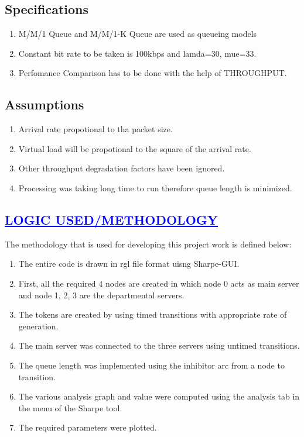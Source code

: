 \documentclass[a4paper,12pt]{report}
\begin{document}
\section*{Specifications}
\begin{enumerate}
 

 \item M/M/1 Queue and M/M/1-K Queue are used as queueing models
 \item Constant bit rate to be taken is 100kbps and lamda=30, mue=33.
 \item Perfomance Comparison has to be done with the help of THROUGHPUT.
\end{enumerate}

\section*{Assumptions}
\begin{enumerate}
\item Arrival rate propotional to tha packet size.
\item Virtual load will be propotional to the square of the arrival rate.
\item Other throughput degradation factors have been ignored.
\item Processing was taking long time to run therefore queue length is minimized.
\end{enumerate}
 
\begin{center}
\chapter{\textcolor{blue}{\underline {LOGIC USED/METHODOLOGY}}}
\end{center}
The methodology that is used for developing this project work is defined below:
\begin{enumerate} 
\item The entire code is drawn in rgl file format uisng Sharpe-GUI.
\item First, all the required 4 nodes are created in which node 0 acts as main server and node 1, 2, 3 are the departmental servers.
\item The tokens are created by using timed transitions with appropriate rate of generation.
\item The main server was connected to the three servers using untimed transitions.
\item The queue length was implemented using the inhibitor arc from a node to transition.
\item The various analysis graph and value were computed using the analysis tab in the menu of the Sharpe tool.
\item The required parameters were plotted.
\end{enumerate}
\end{document}
